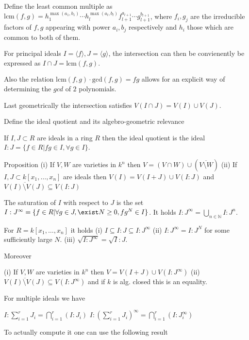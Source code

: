 Define the least common multiple as 
\( \text{lcm}(f, g) = h_1^{\max(a_1, b_1)} \cdots h_l^{\max(a_l, b_l)} f_{l+1}^{a_{l+1}} \cdots g_{l+1}^{b_{l+1}} \),
where \( f_i, g_j \) are the irreducible factors of \( f, g \) appearing with power \( a_i, b_j \) respectively and \( h_i \) those which are
common to both of them.

For principal ideals \( I = \langle f \rangle, J = \langle g \rangle \),
the intersection can then be convienently be expressed as \( I \cap J = \text{lcm}(f,g) \).

Also the relation \( \text{lcm}(f, g) \cdot \text{gcd}(f, g) = fg \) allows for an explicit way of determining the \( gcd \) of \( 2 \) polynomials.

Last geometrically the intersection satisfies \( V(I \cap J) = V(I) \cup V(J) \).


Define the ideal quotient and its algebro-geometric relevance

If \( I, J \subset R \) are ideals in a ring \( R \) then the ideal quotient is the ideal
\( I : J = \{ f \in R | fg \in I, \forall  g \in I \} \).

Proposition
(i) If \( V, W \) are varieties in \( k^n \) then
\( V = (V \cap W) \cup (\overline{V \setminus W}) \)
(ii) If \( I, J \subset k[x_1, \dots, x_n] \) are ideals then
\( V(I) = V(I + J) \cup V(I : J) \)
and \( \overline{V(I) \setminus V(J)} \subseteq V(I:J) \)


The saturation of \( I \) with respect to \( J \) is the set
\( I : J^\infty = \{ f \in R | \forall g \in J, \exist N \geq 0, fg^N \in I \} \).
It holds \( I : J^\infty = \bigcup_{n \in \mathbb{N}} I : J^n \).

For \( R = k[x_1, \dots, x_n] \) it holds
(i) \(I \subseteq I : J \subseteq I : J^\infty \)
(ii) \( I : J^\infty = I : J^N \) for some sufficiently large \( N \).
(iii) \( \sqrt{I : J^\infty} = \sqrt{I} : J \).

Moreover 

(i) If \( V, W \) are varieties in \( k^n \) then
\( V = V(I+J) \cup V(I : J^\infty) \)
(ii) 
\( \overline{V(I) \setminus V(J)} \subseteq V(I: J^\infty) \)
and if \( k \) is alg. closed this is an equality.

For multiple ideals we have

\( I : \sum_{i=1}^r J_i = \bigcap_{i=1}^r (I : J_i) \)
\( I : \left(\sum_{i=1}^r J_i \right)^\infty = \bigcap_{i=1}^r (I : J_{i}^\infty) \)


To actually compute it one can use the following result

